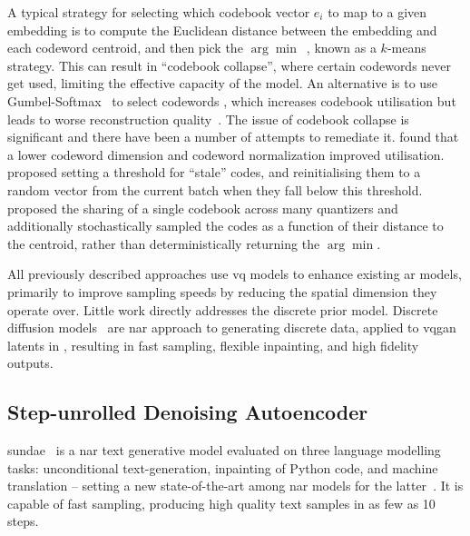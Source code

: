 A typical strategy for selecting which codebook vector $e_i$ to map to a given
embedding is to compute the Euclidean distance between the embedding and each
codeword centroid, and then pick the $\arg\min$~\cite{oord2017vqvae}, known as a
$k$-means strategy. This can result in ``codebook collapse'', where certain
codewords never get used, limiting the effective capacity of the model. An
alternative is to use Gumbel-Softmax~\cite{jang2016gumbel} to select codewords ,
which increases codebook utilisation but leads to worse reconstruction
quality~\cite{bondtaylor2021unleashing}.
The issue of codebook collapse is significant and there have been a number
of attempts to remediate it. \cite{yu2021vqgan} found that a lower codeword
dimension and codeword normalization improved utilisation.
\cite{zeghidour2021soundstream} proposed setting a threshold for ``stale'' codes,
and reinitialising them to a random vector from the current batch when they
fall below this threshold. \cite{lee2022rqvae} proposed the sharing of a single
codebook across many quantizers and additionally stochastically sampled the
codes as a function of their distance to the centroid, rather than
deterministically returning the $\arg\min$.

All previously described approaches use \gls{vq} models to enhance existing
\gls{ar} models, primarily to improve sampling speeds by reducing the
spatial dimension they operate over. Little work directly addresses the
discrete prior model. Discrete diffusion models~\cite{austin2021structured} are
\gls{nar} approach to generating discrete data, applied to \gls{vqgan}
latents in \citet{bondtaylor2021unleashing}, resulting in fast sampling,
flexible inpainting, and high fidelity outputs.

\subsection{Step-unrolled Denoising Autoencoder}
\label{subsec:sundae}

\Gls{sundae}~\cite{savinov2022stepunrolled} is a \gls{nar} text generative model
evaluated on three language modelling tasks: unconditional text-generation,
inpainting of Python code, and machine translation -- setting a new
state-of-the-art among \gls{nar} models for the
latter~\cite{savinov2022stepunrolled}. It is capable of fast sampling, producing
high quality text samples in as few as 10 steps.

